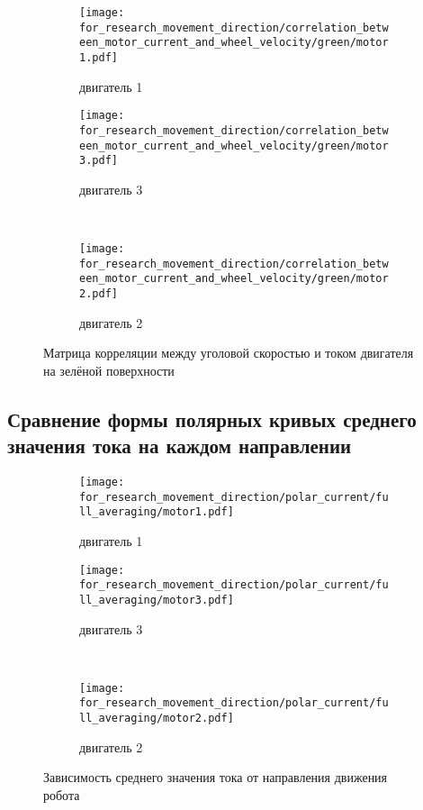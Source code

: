 \begin{figure}[H]
    \centering
    \begin{subfigure}{0.49\textwidth}
        \centering
        \texttt{[image: for\_research\_movement\_direction/correlation\_between\_motor\_current\_and\_wheel\_velocity/green/motor1.pdf]}
        \caption{двигатель 1}
    \end{subfigure}
    \hspace{0.005\textwidth}
    \begin{subfigure}{0.49\textwidth}
        \centering
        \texttt{[image: for\_research\_movement\_direction/correlation\_between\_motor\_current\_and\_wheel\_velocity/green/motor3.pdf]}
        \caption{двигатель 3}
    \end{subfigure} \\
    \vspace{4pt}
    \centering
    \begin{subfigure}{0.49\textwidth}
        \centering
        \texttt{[image: for\_research\_movement\_direction/correlation\_between\_motor\_current\_and\_wheel\_velocity/green/motor2.pdf]}
        \caption{двигатель 2}
    \end{subfigure}
    \caption{Матрица корреляции между уголовой скоростью и током двигателя на зелёной поверхности}
\end{figure}

\subsection{Сравнение формы полярных кривых среднего значения тока на каждом направлении}

\begin{figure}[H]
    \centering
    \begin{subfigure}{0.49\textwidth}
        \centering
        \texttt{[image: for\_research\_movement\_direction/polar\_current/full\_averaging/motor1.pdf]}
        \caption{двигатель 1}
    \end{subfigure}
    \hspace{0.005\textwidth}
    \begin{subfigure}{0.49\textwidth}
        \centering
        \texttt{[image: for\_research\_movement\_direction/polar\_current/full\_averaging/motor3.pdf]}
        \caption{двигатель 3}
    \end{subfigure} \\
    \vspace{4pt}
    \centering
    \begin{subfigure}{0.49\textwidth}
        \centering
        \texttt{[image: for\_research\_movement\_direction/polar\_current/full\_averaging/motor2.pdf]}
        \caption{двигатель 2}
    \end{subfigure}
    \caption{Зависимость среднего значения тока от направления движения робота}
\end{figure}

